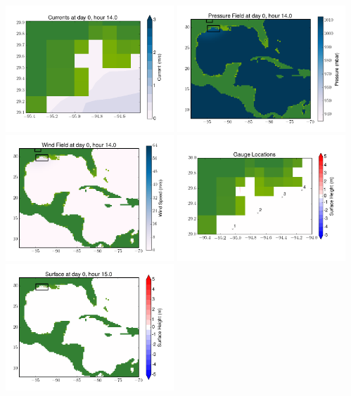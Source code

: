 \documentclass[11pt]{article}
\begin{document}
\vskip 10pt 
\includegraphics[width=0.475\textwidth]{frame0086fig7.png}
\includegraphics[width=0.475\textwidth]{frame0086fig8.png}
\vskip 10pt 
\includegraphics[width=0.475\textwidth]{frame0086fig9.png}
\includegraphics[width=0.475\textwidth]{frame0086fig10.png}
\vskip 10pt 
\includegraphics[width=0.475\textwidth]{frame0087fig1.png}
\end{document}
